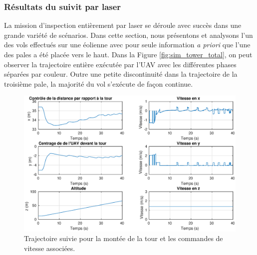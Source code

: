 \subsubsection{Résultats du suivit par laser}

La mission d'inspection entièrement par laser se déroule avec succès dans une grande variété de scénarios. Dans cette section, nous présentons et analysons l'un des vols effectués sur une éolienne avec pour seule information \textit{a priori} que l'une des pales a été placée vers le haut. Dans la Figure \ref{fig:sim_tower_total}, on peut observer la trajectoire entière exécutée par l'UAV avec les différentes phases séparées par couleur. Outre une petite discontinuité dans la trajectoire de la troisième pale, la majorité du vol s'exécute de façon continue.
\begin{figure}[!htb]
  \centering
  \includegraphics[width=\linewidth]{images/sim_tower_ascent}
  \caption{Trajectoire suivie pour la montée de la tour et les commandes de vitesse associées.}
  \label{fig:sim_tower_ascent}
\end{figure}

